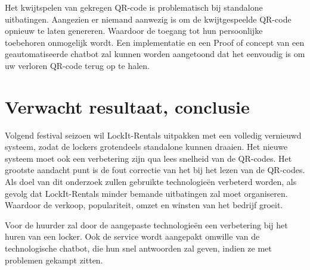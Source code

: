 \documentclass{hogent-article}
\begin{document}
Het kwijtspelen van gekregen QR-code is problematisch bij standalone uitbatingen. Aangezien er niemand aanwezig is om de kwijtgespeelde QR-code opnieuw te laten genereren. Waardoor de toegang tot hun persoonlijke toebehoren onmogelijk wordt.
Een implementatie en een Proof of concept van een geautomatiseerde chatbot zal kunnen worden aangetoond dat het eenvoudig is om uw verloren QR-code terug op te halen.



\section{Verwacht resultaat, conclusie}%
\label{sec:verwachte_resultaten}

Volgend festival seizoen wil LockIt-Rentals uitpakken met een volledig vernieuwd systeem, zodat de lockers grotendeels standalone kunnen draaien. Het nieuwe systeem moet ook een verbetering zijn qua lees snelheid van de QR-codes. Het grootste aandacht punt is de fout correctie van het bij het lezen van de QR-codes. Als doel van dit onderzoek zullen gebruikte technologieën verbeterd worden, als gevolg dat LockIt-Rentals minder bemande uitbatingen zal moet organiseren. Waardoor de verkoop, populariteit, omzet en winsten van het bedrijf groeit.

Voor de huurder zal door de aangepaste technologieën een verbetering bij het huren van een locker. Ook de service wordt aangepakt omwille van de technologische chatbot, die hun snel antwoorden zal geven, indien ze met problemen gekampt zitten.



\printbibliography[heading=bibintoc]
\end{document}
